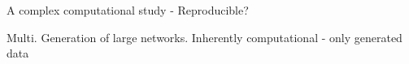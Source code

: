 
\begin{frame}{A complex computational study - Reproducible?}

  Multi. Generation of large networks. Inherently computational - only generated data
  
  
  
\end{frame}
